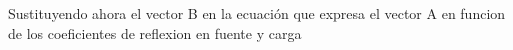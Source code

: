 \documentclass{article}
\begin{document}
\begin{maplegroup}
\mapleresult
{}
\end{maplegroup}
\begin{Maple Normal}{
\begin{Maple Normal}{
Sustituyendo ahora el vector B en la ecuación que expresa el vector A en funcion de los coeficientes de reflexion en fuente y carga}\end{Maple Normal}

}\end{Maple Normal}
\end{document}
